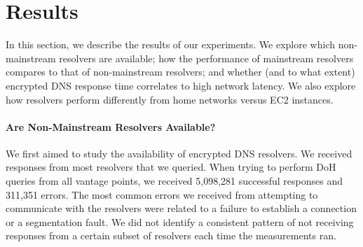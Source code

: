 \section{Results}\label{sec:results} 

In this section, we describe the results of our experiments.  We explore which
non-mainstream resolvers are available; how
the performance of mainstream resolvers compares to that of non-mainstream
resolvers; and whether (and to what extent) encrypted DNS response time
correlates to high network latency. We also explore how resolvers perform 
differently from home networks versus EC2 instances. 

\paragraph{Are Non-Mainstream Resolvers Available?}
We first aimed to study the availability of encrypted DNS
resolvers. 
We received responses from most resolvers that we queried. When trying to perform DoH queries from all vantage points,
we received 5,098,281 successful responses and 311,351 errors. 
The most common errors we received from attempting to communicate with
the resolvers were related to a failure to establish a connection or a segmentation fault.
We did not identify a consistent pattern of not receiving responses from a certain
subset of resolvers each time the measurements ran. 


